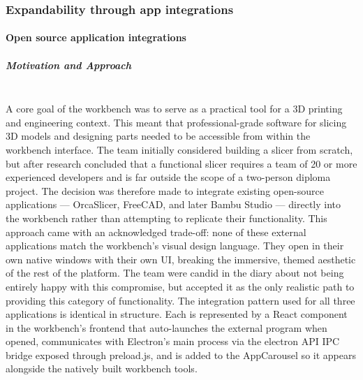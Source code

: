 \documentclass[a4paper,12pt]{article}
\begin{document}
\newpage
\subsubsection{Expandability through app integrations}
\paragraph{Open source application integrations} 
\subparagraph{Motivation and Approach} \mbox{} \\
A core goal of the workbench was to serve as a practical tool for a 3D printing and engineering context. This meant that professional-grade software for slicing 3D models and designing parts needed to be accessible from within the workbench interface. The team initially considered building a slicer from scratch, but after research concluded that a functional slicer requires a team of 20 or more experienced developers and is far outside the scope of a two-person diploma project. The decision was therefore made to integrate existing open-source applications — OrcaSlicer, FreeCAD, and later Bambu Studio — directly into the workbench rather than attempting to replicate their functionality.
This approach came with an acknowledged trade-off: none of these external applications match the workbench's visual design language. They open in their own native windows with their own UI, breaking the immersive, themed aesthetic of the rest of the platform. The team were candid in the diary about not being entirely happy with this compromise, but accepted it as the only realistic path to providing this category of functionality.
The integration pattern used for all three applications is identical in structure. Each is represented by a React component in the workbench's frontend that auto-launches the external program when opened, communicates with Electron's main process via the electron API IPC bridge exposed through preload.js, and is added to the AppCarousel so it appears alongside the natively built workbench tools.
\end{document}
